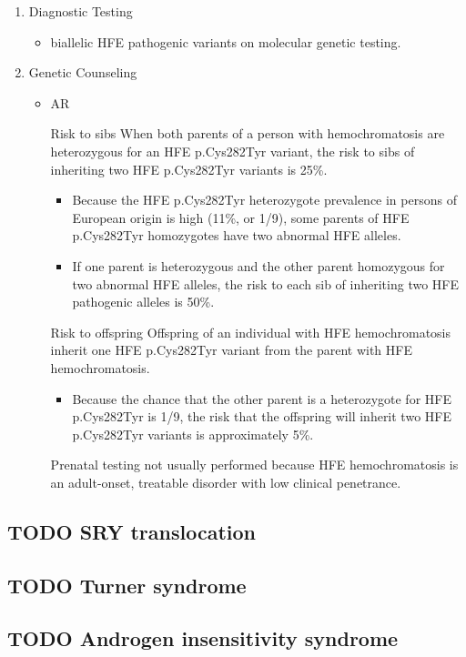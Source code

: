 \documentclass{scrartcl}
\begin{document}
\begin{enumerate}
\item Diagnostic Testing
\label{sec:org303ab9c}
\begin{itemize}
\item biallelic HFE pathogenic variants on molecular genetic testing.
\end{itemize}
\item Genetic Counseling
\label{sec:orgc56e1b9}
\begin{itemize}
\item AR
\item[{Risk to sibs}] When both parents of a person with hemochromatosis are heterozygous for an HFE p.Cys282Tyr variant, the risk to sibs of inheriting two HFE p.Cys282Tyr variants is 25\%.
\begin{itemize}
\item Because the HFE p.Cys282Tyr heterozygote prevalence in persons of European origin is high (11\%, or 1/9), some parents of HFE p.Cys282Tyr homozygotes have two abnormal HFE alleles.
\item If one parent is heterozygous and the other parent homozygous for two abnormal HFE alleles, the risk to each sib of inheriting two HFE pathogenic alleles is 50\%.
\end{itemize}
\item[{Risk to offspring}] Offspring of an individual with HFE hemochromatosis inherit one HFE p.Cys282Tyr variant from the parent with HFE hemochromatosis.
\begin{itemize}
\item Because the chance that the other parent is a heterozygote for HFE p.Cys282Tyr is 1/9, the risk that the offspring will inherit two HFE p.Cys282Tyr variants is approximately 5\%.
\end{itemize}
\item[{Prenatal testing}] not usually performed because HFE hemochromatosis is an adult-onset, treatable disorder with low clinical penetrance.
\end{itemize}
\end{enumerate}
\subsection{{\bfseries\sffamily TODO} SRY translocation}
\label{sec:org1130eee}
\subsection{{\bfseries\sffamily TODO} Turner syndrome}
\label{sec:org5602ede}
\subsection{{\bfseries\sffamily TODO} Androgen insensitivity syndrome}
\label{sec:org7b3062a}
\end{document}

